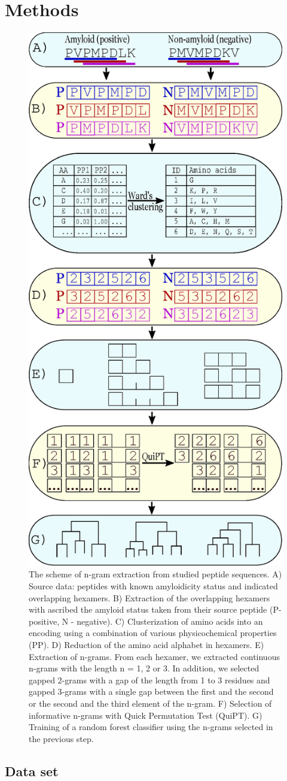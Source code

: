 \documentclass[fleqn,10pt,twoside]{gcb15submission}
\begin{document}
\section{Methods}

\begin{figure}[bth]
\centerline{\includegraphics[width=0.3\linewidth]{figures/ngram_scheme.eps}} 
\caption{The scheme of n-gram extraction from studied peptide sequences. 
A) Source data: peptides with known amyloidicity status and indicated 
overlapping hexamers. 
B) Extraction of the overlapping hexamers with ascribed the 
amyloid status taken from their source peptide (P-positive, N - 
negative). 
C) Clusterization of amino acids into an encoding using a combination of 
various 
physicochemical properties (PP). 
D) Reduction of the amino acid alphabet in hexamers. 
E) Extraction of n-grams. From each hexamer, we extracted continuous n-grams 
with the length n = 1, 2 or 3. In addition, we selected gapped 2-grams with a 
gap of the length from 1 to 3 residues and gapped 3-grams with a single gap 
between the first and the second or the second and the third element of the 
n-gram.
F) Selection of informative n-grams with Quick Permutation Test (QuiPT).
G) Training of a random forest classifier using the n-grams selected in the 
previous 
step.}\label{fig:ngram_scheme} 
\end{figure}

\subsection{Data set}
\end{document}
